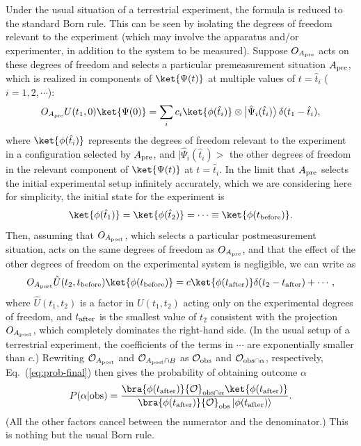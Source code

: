 \documentclass[12pt]{article}
\begin{document}
Under the usual situation of a terrestrial experiment, the formula is 
reduced to the standard Born rule.  This can be seen by isolating the 
degrees of freedom relevant to the experiment (which may involve the 
apparatus and/or experimenter, in addition to the system to be measured). 
Suppose $O_{A_{\rm pre}}$ acts on these degrees of freedom and selects 
a particular premeasurement situation $A_{\rm pre}$, which is realized 
in components of $\ket{\Psi(t)}$ at multiple values of $t = \hat{t}_i$ 
($i=1,2,\cdots$):
%
\begin{equation}
  O_{A_{\rm pre}} U(t_1,0) \ket{\Psi(0)} 
  = \sum_i c_i \ket{\phi(\hat{t}_i)} \otimes 
      \bigl| \hat{\Psi}_i(\hat{t}_i) \bigr>\, \delta(t_1-\hat{t}_i),
\label{eq:QM-initial}
\end{equation}
%
where $\ket{\phi(\hat{t}_i)}$ represents the degrees of freedom relevant 
to the experiment in a configuration selected by $A_{\rm pre}$, and 
$\bigl| \hat{\Psi}_i(\hat{t}_i) \bigr>$ the other degrees of freedom 
in the relevant component of $\ket{\Psi(t)}$ at $t = \hat{t}_i$.  In 
the limit that $A_{\rm pre}$ selects the initial experimental setup 
infinitely accurately, which we are considering here for simplicity, 
the initial state for the experiment is
%
\begin{equation}
  \ket{\phi(\hat{t}_1)} = \ket{\phi(\hat{t}_2)} = \cdots 
  \equiv \ket{\phi(t_{\rm before})}.
\label{eq:exp-initial}
\end{equation}
%
Then, assuming that $O_{A_{\rm post}}$, which selects a particular 
postmeasurement situation, acts on the same degrees of freedom as 
$O_{A_{\rm pre}}$, and that the effect of the other degrees of freedom 
on the experimental system is negligible, we can write as
%
\begin{equation}
  O_{A_{\rm post}} \hat{U}(t_2,t_{\rm before}) \ket{\phi(t_{\rm before})} 
  = c \ket{\phi(t_{\rm after})} \delta(t_2 - t_{\rm after}) + \cdots,
\label{eq:exp-after}
\end{equation}
%
where $\hat{U}(t_1,t_2)$ is a factor in $U(t_1,t_2)$ acting only on the 
experimental degrees of freedom, and $t_{\rm after}$ is the smallest 
value of  $t_2$ consistent with the projection $O_{A_{\rm post}}$, which 
completely dominates the right-hand side.  (In the usual setup of a 
terrestrial experiment, the coefficients of the terms in $\cdots$ are 
exponentially smaller than $c$.)  Rewriting ${\cal O}_{A_{\rm post}}$ 
and ${\cal O}_{A_{\rm post} \cap B}$ as ${\cal O}_{\rm obs}$ and 
${\cal O}_{{\rm obs} \cap \alpha}$, respectively, Eq.~(\ref{eq:prob-final}) 
then gives the probability of obtaining outcome $\alpha$
%
\begin{equation}
  P(\alpha|{\rm obs}) = \frac{\bra{\phi(t_{\rm after})} 
    {\cal O}_{{\rm obs} \cap \alpha} \ket{\phi(t_{\rm after})}}
  {\bra{\phi(t_{\rm after})} 
    {\cal O}_{\rm obs} \left| \phi(t_{\rm after}) \right>}.
\label{eq:prob-Born}
\end{equation}
%
(All the other factors cancel between the numerator and the denominator.) 
This is nothing but the usual Born rule.
\end{document}
